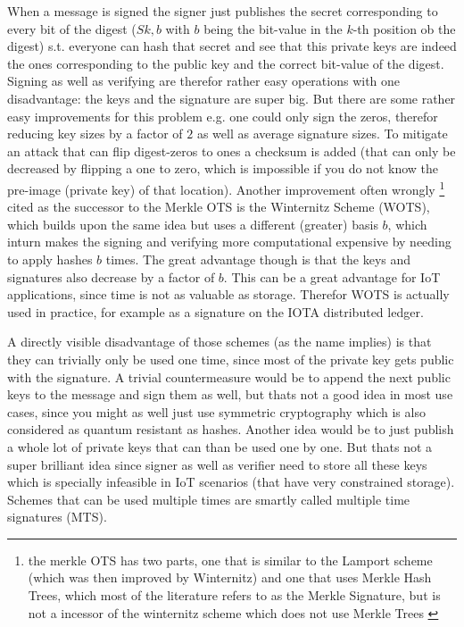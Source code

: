 \documentclass[conference]{IEEEtran}
\begin{document}
When a message is signed the signer just publishes the secret corresponding to every bit of the digest ($S{k,b}$ with $b$ being the bit-value in the $k$-th position ob the digest) s.t. everyone can hash that secret and see that this private keys are indeed the ones corresponding to the public key and the correct bit-value of the digest.
Signing as well as verifying are therefor rather easy operations with one disadvantage: the keys and the signature are super big.
But there are some rather easy improvements for this problem e.g. one could only sign the zeros, therefor reducing key sizes by a factor of $2$ as well as average signature sizes. To mitigate an attack that can flip digest-zeros to ones a checksum is added (that can only be decreased by flipping a one to zero, which is impossible if you do not know the pre-image (private key) of that location).
Another improvement often wrongly
\footnote{the merkle OTS has two parts, one that is similar to the Lamport scheme (which was then improved by Winternitz) and one that uses Merkle Hash Trees, which most of the literature refers to as the Merkle Signature, but is not a incessor of the winternitz scheme which does not use Merkle Trees \cite{merkle_ots}} 
cited as the successor to the Merkle OTS is the Winternitz Scheme (WOTS), which builds upon the same idea but uses a different (greater) basis $b$, which inturn makes the signing and verifying more computational expensive by needing to apply hashes $b$ times. The great advantage though is that the keys and signatures also decrease by a factor of $b$.
This can be a great advantage for IoT applications, since time is not as valuable as storage. Therefor WOTS is actually used in practice, for example as a signature on the IOTA distributed ledger. \cite{iota_wots}

A directly visible disadvantage of those schemes (as the name implies) is that they can trivially only be used one time, since most of the private key gets public with the signature. 
A trivial countermeasure would be to append the next public keys to the message and sign them as well, but thats not a good idea in most use cases, since you might as well just use symmetric cryptography which is also considered as quantum resistant as hashes.
Another idea would be to just publish a whole lot of private keys that can than be used one by one. But thats not a super brilliant idea since signer as well as verifier need to store all these keys which is specially infeasible in IoT scenarios (that have very constrained storage).
Schemes that can be used multiple times are smartly called multiple time signatures (MTS).
\end{document}
